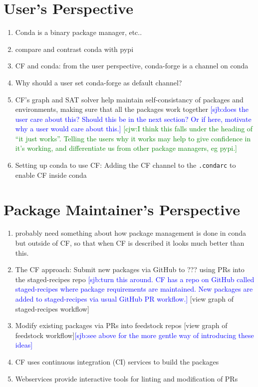 \documentclass[fleqn,10pt,lineno]{wlpeerj} %
\newcommand{\sjb}[1]{\textcolor{blue}{[sjb:#1]}}
\newcommand{\cjw}[1]{\textcolor{green}{[cjw:#1]}}
\newcounter{saveenumi}
\newcommand{\seti}{\setcounter{saveenumi}{\value{enumi}}}
\newcommand{\conti}{\setcounter{enumi}{\value{saveenumi}}}
\begin{document}
\section*{User's Perspective}
\begin{enumerate}\conti
\item Conda is a binary package manager, etc..
\item compare and contrast conda with pypi
\item CF and conda:  from the user perspective, conda-forge is a channel on conda
\item Why should a user set conda-forge as default channel?
\item CF's graph and SAT solver help maintain self-consistancy of
packages and environments, making sure that all the packages work together
\sjb{does the user care about this?  Should this be in the next section?  Or if here, motivate why a user would care about this.}
\cjw{I think this falls under the heading of ``it just works''. Telling the users why it works may help to give confidence
in it's working, and differentiate us from other package managers, eg pypi.}
\item Setting up conda to use CF: Adding the CF channel to the \texttt{.condarc} to enable CF
inside conda
\end{enumerate}\seti

\section*{Package Maintainer's Perspective}
\begin{enumerate}\conti
\item probably need something about how package management is done in conda but outside of CF, so that when CF is described it looks much better than this.
\item The CF approach: Submit new packages via GitHub to ??? using PRs into the staged-recipes repo
\sjb{turn this around.  CF has a repo on GitHub called staged-recipes where package requirements are maintained.  New packages are added to staged-recipes via usual GitHub PR workflow.}
[view graph of staged-recipes workflow]
\item Modify existing packages via PRs into feedstock repos [view graph of
feedstock workflow]\sjb{see above for the more gentle way of introducing these ideas}
\item CF uses continuous integration (CI) services to build the packages
\item Webservices provide interactive tools for linting and modification of PRs
\end{enumerate}\seti
\end{document}

